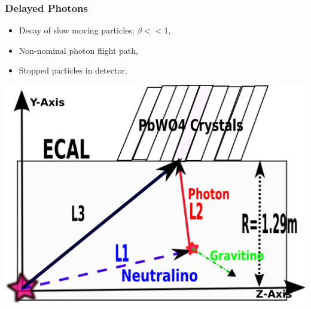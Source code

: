 \documentclass{beamer}
\begin{document}
\begin{frame}
\frametitle{Delayed Photons}
\begin{minipage}[t]{.85\paperwidth}
   \begin{tcolorbox}[colback=UNL@Cream!5,colframe=UNL@Cream!70,title=\textcolor{UMN@Maroon}{\textbf{Source of Delayed Photons? }}]
     \begin{itemize}
      \item Decay of slow moving particles; $\beta << 1$,
      \item Non-nominal photon flight path,
      \item Stopped particles in detector.
     \end{itemize}
      \includegraphics[height=0.5\textwidth, width=\linewidth]{THESISPLOTS/DelayedPhoton-ECAL.png}
    \end{tcolorbox}
   \end{minipage}
\end{frame}
\end{document}
